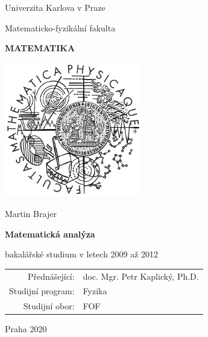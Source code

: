 
\begin{center}

\large

Univerzita Karlova v Praze

\medskip

Matematicko-fyzikální fakulta

\vfill

{\bf\Large MATEMATIKA}

\vfill

\centerline{\mbox{\includegraphics[width=60mm]{../img/mainPage/logoMFF.png}}}

\vfill
\vspace{5mm}

{\LARGE Martin Brajer}

\vspace{15mm}

{\LARGE\bfseries Matematická analýza}

\vfill

bakalářské studium v letech 2009 až 2012

\vfill

\begin{tabular}{rl}

Přednášející: & doc. Mgr. Petr Kaplický, Ph.D. \\
\noalign{\vspace{2mm}}
Studijní program: & Fyzika \\
\noalign{\vspace{2mm}}
Studijní obor: & FOF \\
\end{tabular}

\vfill

Praha 2020

\end{center}